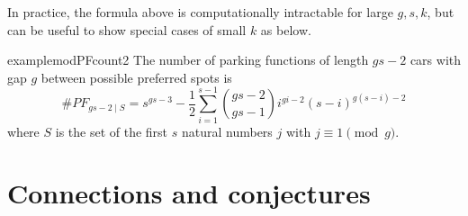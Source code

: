 \documentclass[12 pt]{amsart}
\theoremstyle{definition} %
\theoremstyle{remark} %
\begin{document}
In practice, the formula above is computationally intractable for large $g, s, k$, but can be useful to show special cases of small $k$ as below.

\begin{restatable}{example}{modPFcount2}
	The number of parking functions of length $gs - 2$ cars with gap $g$ between possible preferred spots is
	\[
		\#PF_{gs - 2 \mid S} = s^{gs - 3} - \frac{1}{2} \sum_{i = 1}^{s - 1} \binom{gs - 2}{gs - 1} i^{gi - 2} (s - i)^{g(s - i) - 2}
	\]
	where $S$ is the set of the first $s$ natural numbers $j$ with $j \equiv 1 \pmod g$.
\end{restatable}

\section{Connections and conjectures}



\end{document}
